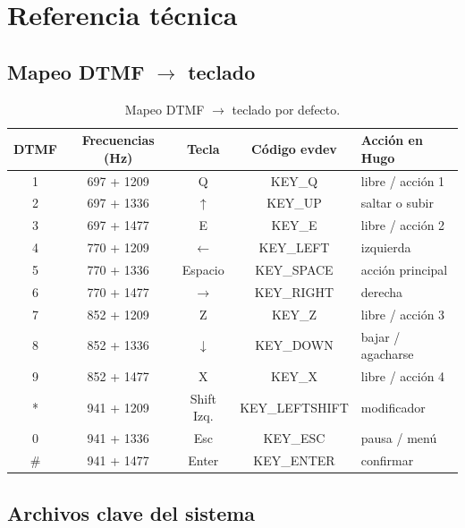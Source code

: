 \chapter{Referencia técnica}

\section{Mapeo DTMF $\to$ teclado}

\begin{table}[h]
\centering
\begin{tabular}{ccccp{5cm}}
\toprule
\textbf{DTMF} & \textbf{Frecuencias (Hz)} & \textbf{Tecla} & \textbf{Código evdev} & \textbf{Acción en Hugo} \\
\midrule
1 & 697 + 1209 & Q & KEY\_Q & libre / acción 1 \\
2 & 697 + 1336 & $\uparrow$ & KEY\_UP & saltar o subir \\
3 & 697 + 1477 & E & KEY\_E & libre / acción 2 \\
4 & 770 + 1209 & $\leftarrow$ & KEY\_LEFT & izquierda \\
5 & 770 + 1336 & Espacio & KEY\_SPACE & acción principal \\
6 & 770 + 1477 & $\rightarrow$ & KEY\_RIGHT & derecha \\
7 & 852 + 1209 & Z & KEY\_Z & libre / acción 3 \\
8 & 852 + 1336 & $\downarrow$ & KEY\_DOWN & bajar / agacharse \\
9 & 852 + 1477 & X & KEY\_X & libre / acción 4 \\
* & 941 + 1209 & Shift Izq. & KEY\_LEFTSHIFT & modificador \\
0 & 941 + 1336 & Esc & KEY\_ESC & pausa / menú \\
\# & 941 + 1477 & Enter & KEY\_ENTER & confirmar \\
\bottomrule
\end{tabular}
\caption{Mapeo DTMF $\to$ teclado por defecto.}
\end{table}

\section{Archivos clave del sistema}


